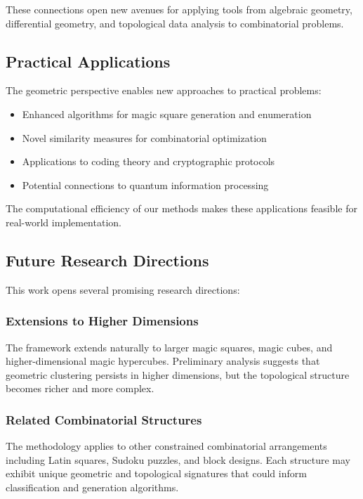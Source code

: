 These connections open new avenues for applying tools from algebraic geometry, differential geometry, and topological data analysis to combinatorial problems.

\subsection{Practical Applications}

The geometric perspective enables new approaches to practical problems:

\begin{itemize}
    \item Enhanced algorithms for magic square generation and enumeration
    \item Novel similarity measures for combinatorial optimization
    \item Applications to coding theory and cryptographic protocols
    \item Potential connections to quantum information processing
\end{itemize}

The computational efficiency of our methods makes these applications feasible for real-world implementation.

\subsection{Future Research Directions}

This work opens several promising research directions:

\subsubsection{Extensions to Higher Dimensions}

The framework extends naturally to larger magic squares, magic cubes, and higher-dimensional magic hypercubes. Preliminary analysis suggests that geometric clustering persists in higher dimensions, but the topological structure becomes richer and more complex.

\subsubsection{Related Combinatorial Structures}

The methodology applies to other constrained combinatorial arrangements including Latin squares, Sudoku puzzles, and block designs. Each structure may exhibit unique geometric and topological signatures that could inform classification and generation algorithms.

